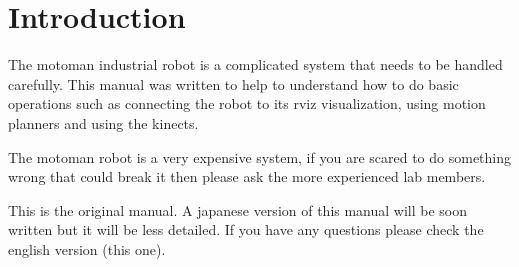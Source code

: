 \chapter{Introduction}

The motoman industrial robot is a complicated system that needs to be handled carefully. This manual was written to help to understand how to do basic operations such as connecting the robot to its rviz visualization, using motion planners and using the kinects.

The motoman robot is a very expensive system, if you are scared to do something wrong that could break it then please ask the more experienced lab members.

This is the original manual. A japanese version of this manual will be soon written but it will be less detailed. If you have any questions please check the english version (this one).